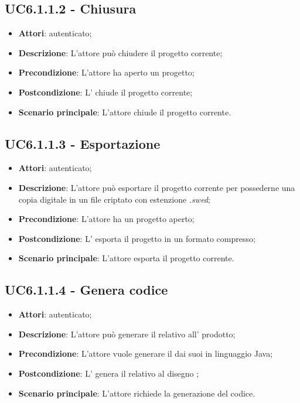 \subsection{UC6.1.1.2 - Chiusura}
\label{ssec:UC6.1.1.2}
\begin{itemize}
\item \textbf{Attori}:  autenticato;
\item \textbf{Descrizione}: L’attore può chiudere il progetto corrente;
\item \textbf{Precondizione}: L'attore ha aperto un progetto;
\item \textbf{Postcondizione}: L’ chiude il progetto corrente;
\item \textbf{Scenario principale}: L'attore chiude il progetto corrente.
\end{itemize}
\subsection{UC6.1.1.3 - Esportazione}
\label{ssec:UC6.1.1.3}
\begin{itemize}
\item \textbf{Attori}:  autenticato;
\item \textbf{Descrizione}: L’attore può esportare il progetto corrente per possederne una copia digitale in un file criptato con estenzione \emph{.swed};
\item \textbf{Precondizione}: L’attore ha un progetto aperto;
\item \textbf{Postcondizione}: L’ esporta il progetto in un formato compresso;
\item \textbf{Scenario principale}: L'attore esporta il progetto corrente.
\end{itemize}
\subsection{UC6.1.1.4 - Genera codice}
\label{ssec:UC6.1.1.4}
\begin{itemize}
\item \textbf{Attori}:  autenticato;
\item \textbf{Descrizione}: L’attore può generare il  relativo all’ prodotto;
\item \textbf{Precondizione}: L’attore vuole generare il  dai suoi   in linguaggio Java;
\item \textbf{Postcondizione}: L’ genera il  relativo al disegno ;
\item \textbf{Scenario principale}: L'attore richiede la generazione del codice.
\end{itemize}
